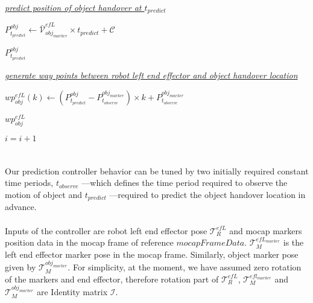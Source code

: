 \documentclass[]{article}
\begin{document}
\begin{algorithm}[H]
\begin{algorithmic}[1]
		
		\Statex \underline{\textit{predict position of object handover at $t_{predict}$}}
		
		\State $P^{obj}_{t_{predict}} \gets \mathcal{\bar{V}}^{efL}_{obj_{marker}}\times t_{predict}  + \mathcal{C}$ %
		
		\Return $P^{obj}_{t_{predict}}$
		
		\EndFunction\newline
		
	
		\Statex \underline{\textit{generate way points between robot left end effector and object handover location}}
		
		
		
		\State $wp^{efL}_{obj}(k) \gets (P^{obj}_{t_{predict}} - P^{obj_{marker}}_{t_{observe}}) \times k  +  P^{obj_{marker}}_{t_{observe}} $ 
		
		\EndFor
		
		\Return $wp^{efL}_{obj}$
		
		\EndFunction\newline
		
		\EndIf %
		
		\State $i = i + 1$
		
		\EndIf %
		
	\end{algorithmic}

\end{algorithm}

\section*{}
Our prediction controller behavior can be tuned by two initially required constant time periods, $t_{observe}$ ---which defines the time period required to observe the motion of object and $t_{predict}$ ---required to predict the object handover location in advance.

\paragraph*{}
Inputs of the controller are robot left end effector pose $\mathcal{T}^{efL}_R$ and mocap markers position data in the mocap frame of reference $mocapFrameData$. $\mathcal{T}^{efL_{marker}}_M$ is the left end effector marker pose in the mocap frame. Similarly, object marker pose given by $\mathcal{T}^{obj_{marker}}_M$. For simplicity, at the moment, we have assumed zero rotation of the markers and end effector, therefore rotation part of $\mathcal{T}^{efL}_R$, $\mathcal{T}^{efl_{marker}}_M$ and $\mathcal{T}^{obj_{marker}}_M$ are Identity matrix $\mathcal{I}$. 
\end{document}
